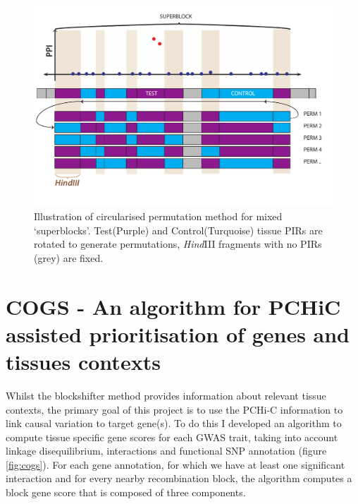 \documentclass[a4paper,11pt]{report}
\begin{document}
\begin{figure}[h]

\includegraphics[width=\textwidth]{blockshifter.pdf}
\caption{Illustration of circularised permutation method for mixed `superblocks'. Test(Purple) and Control(Turquoise) tissue PIRs are rotated to generate permutations, \textit{Hind}III fragments with no PIRs (grey) are fixed.}
\label{fig:blockshifter}
\centering
\end{figure}

\section{COGS - An algorithm for PCHiC assisted prioritisation of genes and tissues contexts}
Whilst the blockshifter method provides information about relevant tissue contexts, the primary goal of this project is to use the PCHi-C information to link causal variation to target gene(s). To do this
I developed an algorithm to compute tissue specific gene scores for each GWAS trait, taking into account linkage disequilibrium, interactions and functional SNP annotation (figure \ref{fig:cogs}). For each gene annotation, for which we have at least one significant interaction and for every nearby recombination block, the algorithm computes a block gene score that is composed of three components.
\end{document}
